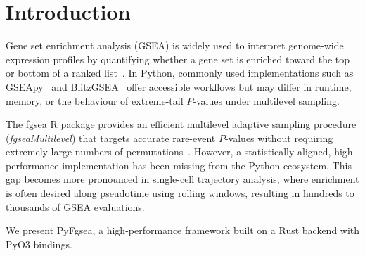 \section{Introduction}

Gene set enrichment analysis (GSEA) is widely used to interpret genome-wide expression profiles by quantifying whether a gene set is enriched toward the top or bottom of a ranked list~\cite{ref1}. In Python, commonly used implementations such as GSEApy~\cite{ref2} and BlitzGSEA~\cite{ref3} offer accessible workflows but may differ in runtime, memory, or the behaviour of extreme-tail $P$-values under multilevel sampling.

The fgsea R package provides an efficient multilevel adaptive sampling procedure (\emph{fgseaMultilevel}) that targets accurate rare-event $P$-values without requiring extremely large numbers of permutations~\cite{ref4}. However, a statistically aligned, high-performance implementation has been missing from the Python ecosystem. This gap becomes more pronounced in single-cell trajectory analysis, where enrichment is often desired along pseudotime using rolling windows, resulting in hundreds to thousands of GSEA evaluations.

We present PyFgsea, a high-performance framework built on a Rust backend with PyO3 bindings. 
